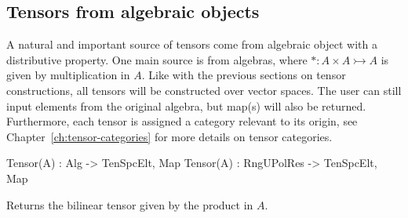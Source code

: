 \subsection{Tensors from algebraic objects}
A natural and important source of tensors come from algebraic object with a distributive property.
One main source is from algebras, where $*:A\times A\rightarrowtail A$ is given by multiplication in $A$. 
Like with the previous sections on tensor constructions, all tensors will be constructed over vector spaces. 
The user can still input elements from the original algebra, but map(s) will also be returned.
Furthermore, each tensor is assigned a category relevant to its origin, see Chapter~\ref{ch:tensor-categories} for more details on tensor categories. 


\begin{intrinsics}
Tensor(A) : Alg -> TenSpcElt, Map
Tensor(A) : RngUPolRes -> TenSpcElt, Map
\end{intrinsics}

Returns the bilinear tensor given by the product in $A$.


